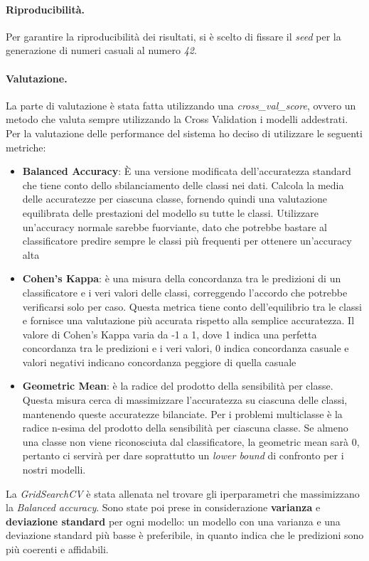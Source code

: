 \paragraph{Riproducibilità.} Per garantire la riproducibilità dei risultati, si è scelto di fissare il \textit{seed} per la generazione di numeri casuali al numero \textit{42}.
\paragraph{Valutazione.} La parte di valutazione è stata fatta utilizzando una \textit{cross\_val\_score}, ovvero un metodo che valuta sempre utilizzando la Cross Validation i modelli addestrati. Per la valutazione delle performance del sistema ho deciso di utilizzare le seguenti metriche:
\begin{itemize}[label=-]
    \item \textbf{Balanced Accuracy}: È una versione modificata dell'accuratezza standard che tiene conto dello sbilanciamento delle classi nei dati. Calcola la media delle accuratezze per ciascuna classe, fornendo quindi una valutazione equilibrata delle prestazioni del modello su tutte le classi. Utilizzare un'accuracy normale sarebbe fuorviante, dato che potrebbe bastare al classificatore predire sempre le classi più frequenti per ottenere un'accuracy alta
    \item \textbf{Cohen's Kappa}: è una misura della concordanza tra le predizioni di un classificatore e i veri valori delle classi, correggendo l'accordo che potrebbe verificarsi solo per caso. Questa metrica tiene conto dell'equilibrio tra le classi e fornisce una valutazione più accurata rispetto alla semplice accuratezza. Il valore di Cohen's Kappa varia da -1 a 1, dove 1 indica una perfetta concordanza tra le predizioni e i veri valori, 0 indica concordanza casuale e valori negativi indicano concordanza peggiore di quella casuale
    \item \textbf{Geometric Mean}: è la radice del prodotto della sensibilità per classe. Questa misura cerca di massimizzare l'accuratezza su ciascuna delle classi, mantenendo queste accuratezze bilanciate. Per i problemi multiclasse è la radice n-esima del prodotto della sensibilità per ciascuna classe. Se almeno una classe non viene riconosciuta dal classificatore, la geometric mean sarà 0, pertanto ci servirà per dare soprattutto un \textit{lower bound} di confronto per i nostri modelli.
\end{itemize}
\noindent La \textit{GridSearchCV} è stata allenata nel trovare gli iperparametri che massimizzano la \textit{Balanced accuracy}. Sono state poi prese in considerazione \textbf{varianza} e \textbf{deviazione standard} per ogni modello: un modello con una varianza e una deviazione standard più basse è preferibile, in quanto indica che le predizioni sono più coerenti e affidabili.

